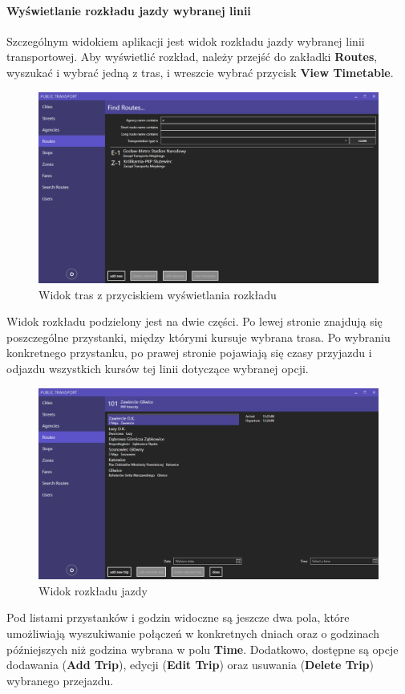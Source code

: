 \documentclass[10pt,a4paper]{article}
\begin{document}
\paragraph{Wyświetlanie rozkładu jazdy wybranej linii}
Szczególnym widokiem aplikacji jest widok rozkładu jazdy wybranej linii transportowej. Aby wyświetlić rozkład, należy przejść do zakładki \textbf{Routes}, wyszukać i wybrać jedną z tras, i wreszcie wybrać przycisk \textbf{View Timetable}.
\begin{figure}[H]
	\centering
	\includegraphics[width=15cm]{Resources/Images/09_filter_route.png}
	\caption{Widok tras z przyciskiem wyświetlania rozkładu}
\end{figure}
Widok rozkładu podzielony jest na dwie części. Po lewej stronie znajdują się poszczególne przystanki, między którymi kursuje wybrana trasa. Po wybraniu konkretnego przystanku, po prawej stronie pojawiają się czasy przyjazdu i odjazdu wszystkich kursów tej linii dotyczące wybranej opcji.
\begin{figure}[H]
	\centering
	\includegraphics[width=15cm]{Resources/Images/10_timetable.png}
	\caption{Widok rozkładu jazdy}
\end{figure}
Pod listami przystanków i godzin widoczne są jeszcze dwa pola, które umożliwiają wyszukiwanie połączeń w konkretnych dniach oraz o godzinach późniejszych niż godzina wybrana w polu \textbf{Time}. Dodatkowo, dostępne są opcje dodawania (\textbf{Add Trip}), edycji (\textbf{Edit Trip}) oraz usuwania (\textbf{Delete Trip}) wybranego przejazdu.
\end{document}
